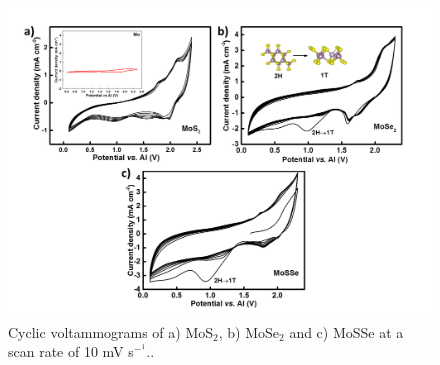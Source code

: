 \documentclass[num-refs]{wiley-article}
\begin{document}
\begin{figure}[h!]
\centering
\includegraphics[width=\textwidth]{figures/fig2}
\caption{Cyclic voltammograms of a) MoS$_2$, b) MoSe$_2$ and c) MoSSe at a scan rate of 10 mV s$^-^1$..}
\end{figure}
\end{document}
